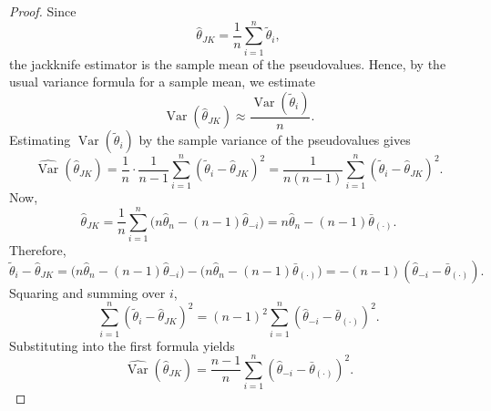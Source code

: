 \documentclass[11pt]{article}
\theoremstyle{definition}
\begin{document}
\begin{proof}
Since
\[
\hat\theta_{JK}=\frac1n\sum_{i=1}^n \tilde\theta_i,
\]
the jackknife estimator is the sample mean of the pseudovalues. Hence, by the usual variance formula for a sample mean, we estimate
\[
\operatorname{Var}(\hat\theta_{JK})
\approx \frac{\operatorname{Var}(\tilde\theta_i)}{n}.
\]
Estimating \(\operatorname{Var}(\tilde\theta_i)\) by the sample variance of the pseudovalues gives
\[
\widehat{\operatorname{Var}}(\hat\theta_{JK})
=
\frac{1}{n}
\cdot
\frac{1}{n-1}
\sum_{i=1}^n
(\tilde\theta_i-\hat\theta_{JK})^2
=
\frac{1}{n(n-1)}
\sum_{i=1}^n
(\tilde\theta_i-\hat\theta_{JK})^2.
\]
Now,
\[
\hat\theta_{JK}
=
\frac1n\sum_{i=1}^n\bigl(n\hat\theta_n-(n-1)\hat\theta_{-i}\bigr)
=
n\hat\theta_n-(n-1)\bar\theta_{(\cdot)}.
\]
Therefore,
\[
\tilde\theta_i-\hat\theta_{JK}
=
\bigl(n\hat\theta_n-(n-1)\hat\theta_{-i}\bigr)
-
\bigl(n\hat\theta_n-(n-1)\bar\theta_{(\cdot)}\bigr)
=-(n-1)(\hat\theta_{-i}-\bar\theta_{(\cdot)}).
\]
Squaring and summing over \(i\),
\[
\sum_{i=1}^n
(\tilde\theta_i-\hat\theta_{JK})^2
=
(n-1)^2
\sum_{i=1}^n
(\hat\theta_{-i}-\bar\theta_{(\cdot)})^2.
\]
Substituting into the first formula yields
\[
\widehat{\operatorname{Var}}(\hat\theta_{JK})
=
\frac{n-1}{n}
\sum_{i=1}^n
(\hat\theta_{-i}-\bar\theta_{(\cdot)})^2.
\]
\end{proof}
\end{document}
